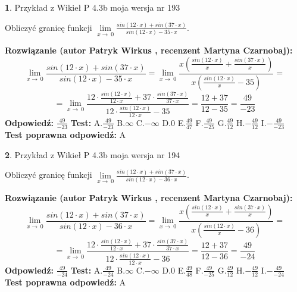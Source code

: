 \documentclass[12pt, a4paper]{article}
\theoremstyle{definition} %
\newtheorem{zad}{}
\newcommand{\zadStart}[1]{\begin{zad}#1\newline}
\newcommand{\zadStop}{\end{zad}}
\newcommand{\rozwStart}[2]{\noindent \textbf{Rozwiązanie (autor #1 , recenzent #2): }\newline}
\newcommand{\rozwStop}{\newline}
\newcommand{\odpStart}{\noindent \textbf{Odpowiedź:}\newline}
\newcommand{\odpStop}{\newline}
\newcommand{\testStart}{\noindent \textbf{Test:}\newline}
\newcommand{\testStop}{\newline}
\newcommand{\kluczStart}{\noindent \textbf{Test poprawna odpowiedź:}\newline}
\newcommand{\kluczStop}{\newline}
\begin{document}
\zadStart{Przykład z Wikieł P 4.3b moja wersja nr 193}


Obliczyć granicę funkcji $\lim\limits_{x\to\ 0}\frac{sin(12 \cdot x)+sin(37 \cdot x)}{sin(12 \cdot x)-35 \cdot x}$.
\zadStop
\rozwStart{Patryk Wirkus}{Martyna Czarnobaj}
$$\lim\limits_{x\to\ 0}\frac{sin(12 \cdot x)+sin(37 \cdot x)}{sin(12 \cdot x)-35 \cdot x}=\lim\limits_{x\to\ 0}\frac{x(\frac{sin(12 \cdot x)}{x}+\frac{sin(37 \cdot x)}{x})}{x(\frac{sin(12 \cdot x)}{x}-35)}=$$
$$=\lim\limits_{x\to\ 0}\frac{12 \cdot \frac{sin(12 \cdot x)}{12 \cdot x}+37 \cdot \frac{sin(37 \cdot x)}{37 \cdot x}}{12 \cdot \frac{sin(12 \cdot x)}{12 \cdot x}-35}=\frac{12+37}{12-35} = \frac{49}{-23}$$
\rozwStop
\odpStart
$\frac{49}{-23}$
\odpStop
\testStart
A.$\frac{49}{-23}$
B.$\infty$
C.$-\infty$
D.$0$
E.$\frac{49}{47}$
F.$\frac{49}{-25}$
G.$\frac{49}{12}$
H.$-\frac{49}{12}$
I.$-\frac{49}{-23}$
\testStop
\kluczStart
A
\kluczStop



\zadStart{Przykład z Wikieł P 4.3b moja wersja nr 194}


Obliczyć granicę funkcji $\lim\limits_{x\to\ 0}\frac{sin(12 \cdot x)+sin(37 \cdot x)}{sin(12 \cdot x)-36 \cdot x}$.
\zadStop
\rozwStart{Patryk Wirkus}{Martyna Czarnobaj}
$$\lim\limits_{x\to\ 0}\frac{sin(12 \cdot x)+sin(37 \cdot x)}{sin(12 \cdot x)-36 \cdot x}=\lim\limits_{x\to\ 0}\frac{x(\frac{sin(12 \cdot x)}{x}+\frac{sin(37 \cdot x)}{x})}{x(\frac{sin(12 \cdot x)}{x}-36)}=$$
$$=\lim\limits_{x\to\ 0}\frac{12 \cdot \frac{sin(12 \cdot x)}{12 \cdot x}+37 \cdot \frac{sin(37 \cdot x)}{37 \cdot x}}{12 \cdot \frac{sin(12 \cdot x)}{12 \cdot x}-36}=\frac{12+37}{12-36} = \frac{49}{-24}$$
\rozwStop
\odpStart
$\frac{49}{-24}$
\odpStop
\testStart
A.$\frac{49}{-24}$
B.$\infty$
C.$-\infty$
D.$0$
E.$\frac{49}{48}$
F.$\frac{49}{-25}$
G.$\frac{49}{12}$
H.$-\frac{49}{12}$
I.$-\frac{49}{-24}$
\testStop
\kluczStart
A
\kluczStop
\end{document}
